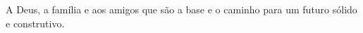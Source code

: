
\renewcommand{\dedicatorianame}{DEDICATÓRIA}

\begin{dedicatoria}

A Deus, a família e aos amigos que são a base e o caminho para um futuro sólido e construtivo. 

\end{dedicatoria}
